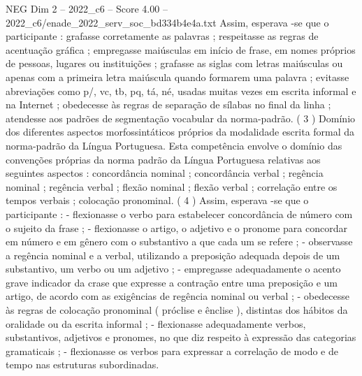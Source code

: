 \begin{textsample}{NEG Dim 2 – 2022\_c6 – Score 4.00 – 2022\_c6/enade\_2022\_serv\_soc\_bd334b4e4a.txt}
Assim, esperava -se que o participante : grafasse corretamente as palavras ; respeitasse as regras de acentuação gráfica ; empregasse maiúsculas em início de frase, em nomes próprios de pessoas, lugares ou instituições ; grafasse as siglas com letras maiúsculas ou apenas com a primeira letra maiúscula quando formarem uma palavra ; evitasse abreviações como p/, vc, tb, pq, tá, né, usadas muitas vezes em escrita informal e na Internet ; obedecesse às regras de separação de sílabas no final da linha ; atendesse aos padrões de segmentação vocabular da norma-padrão. ( 3 ) Domínio dos diferentes aspectos morfossintáticos próprios da modalidade escrita formal da norma-padrão da Língua Portuguesa.
Esta competência envolve o domínio das convenções próprias da norma padrão da Língua Portuguesa relativas aos seguintes aspectos : concordância nominal ; concordância verbal ; regência nominal ; regência verbal ; flexão nominal ; flexão verbal ; correlação entre os tempos verbais ; colocação pronominal. ( 4 ) Assim, esperava -se que o participante : - flexionasse o verbo para estabelecer concordância de número com o sujeito da frase ; - flexionasse o artigo, o adjetivo e o pronome para concordar em número e em gênero com o substantivo a que cada um se refere ; - observasse a regência nominal e a verbal, utilizando a preposição adequada depois de um substantivo, um verbo ou um adjetivo ; - empregasse adequadamente o acento grave indicador da crase que expresse a contração entre uma preposição e um artigo, de acordo com as exigências de regência nominal ou verbal ; - obedecesse às regras de colocação pronominal ( próclise e ênclise ), distintas dos hábitos da oralidade ou da escrita informal ; - flexionasse adequadamente verbos, substantivos, adjetivos e pronomes, no que diz respeito à expressão das categorias gramaticais ; - flexionasse os verbos para expressar a correlação de modo e de tempo nas estruturas subordinadas.

\end{textsample}

